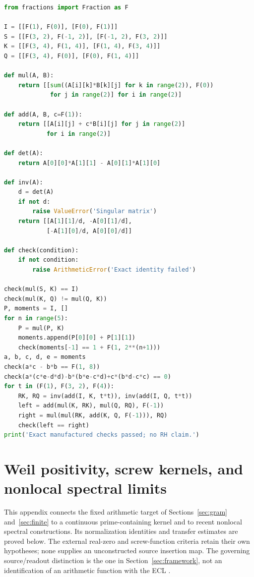 \documentclass[11pt,letterpaper]{article}
\numberwithin{equation}{section}
\theoremstyle{definition}
\theoremstyle{remark}
\begin{document}
\begin{lstlisting}[language=Python,caption={Exact rational verification of the manufactured boundary example.}]
from fractions import Fraction as F

I = [[F(1), F(0)], [F(0), F(1)]]
S = [[F(3, 2), F(-1, 2)], [F(-1, 2), F(3, 2)]]
K = [[F(3, 4), F(1, 4)], [F(1, 4), F(3, 4)]]
Q = [[F(3, 4), F(0)], [F(0), F(1, 4)]]

def mul(A, B):
    return [[sum((A[i][k]*B[k][j] for k in range(2)), F(0))
             for j in range(2)] for i in range(2)]

def add(A, B, c=F(1)):
    return [[A[i][j] + c*B[i][j] for j in range(2)]
            for i in range(2)]

def det(A):
    return A[0][0]*A[1][1] - A[0][1]*A[1][0]

def inv(A):
    d = det(A)
    if not d:
        raise ValueError('Singular matrix')
    return [[A[1][1]/d, -A[0][1]/d],
            [-A[1][0]/d, A[0][0]/d]]

def check(condition):
    if not condition:
        raise ArithmeticError('Exact identity failed')

check(mul(S, K) == I)
check(mul(K, Q) != mul(Q, K))
P, moments = I, []
for n in range(5):
    P = mul(P, K)
    moments.append(P[0][0] + P[1][1])
    check(moments[-1] == 1 + F(1, 2**(n+1)))
a, b, c, d, e = moments
check(a*c - b*b == F(1, 8))
check(a*(c*e-d*d)-b*(b*e-c*d)+c*(b*d-c*c) == 0)
for t in (F(1), F(3, 2), F(4)):
    RK, RQ = inv(add(I, K, t*t)), inv(add(I, Q, t*t))
    left = add(mul(K, RK), mul(Q, RQ), F(-1))
    right = mul(mul(RK, add(K, Q, F(-1))), RQ)
    check(left == right)
print('Exact manufactured checks passed; no RH claim.')
\end{lstlisting}

\section{Weil positivity, screw kernels, and nonlocal spectral limits}
\label{app:weil}
This appendix connects the fixed arithmetic target of Sections~\ref{sec:gram} and~\ref{sec:finite} to a continuous prime-containing kernel and to recent nonlocal spectral constructions. Its normalization identities and transfer estimates are proved below. The external real-zero and screw-function criteria retain their own hypotheses; none supplies an unconstructed source insertion map. The governing source/readout distinction is the one in Section~\ref{sec:framework}, not an identification of an arithmetic function with the ECL \cite{tcgsfoundation,tcgsoperator}.
\end{document}
